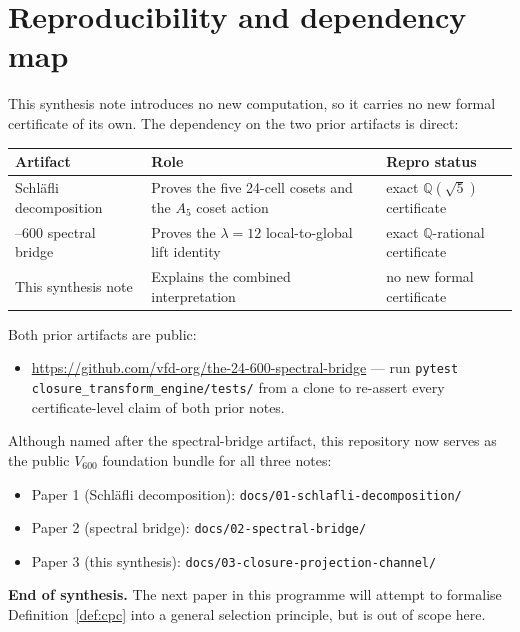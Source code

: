 \documentclass[11pt]{article}
\newcommand{\Vsix}{V_{600}}
\theoremstyle{definition}
\begin{document}
\section{Reproducibility and dependency map}\label{sec:repro}

This synthesis note introduces no new computation, so it carries no
new formal certificate of its own.  The dependency on the two prior
artifacts is direct:

\medskip
\noindent
\begin{tabular}{p{}p{}p{}}
\toprule
Artifact & Role & Repro status \\
\midrule
Schl\"afli decomposition~\cite{SmartSchlafli2026}
  & Proves the five 24-cell cosets and the $A_5$ coset action
  & exact $\mathbb{Q}(\sqrt 5)$ certificate \\
\addlinespace
24--600 spectral bridge~\cite{SmartBridge2026}
  & Proves the $\lambda=12$ local-to-global lift identity
  & exact $\mathbb{Q}$-rational certificate \\
\addlinespace
This synthesis note
  & Explains the combined interpretation
  & no new formal certificate \\
\bottomrule
\end{tabular}
\medskip

Both prior artifacts are public:
\begin{itemize}
  \item \url{https://github.com/vfd-org/the-24-600-spectral-bridge}
        --- run \texttt{pytest closure\_transform\_engine/tests/}
        from a clone to re-assert every certificate-level claim of
        both prior notes.
\end{itemize}

\smallskip
\noindent
Although named after the spectral-bridge artifact, this repository
now serves as the public $\Vsix$ foundation bundle for all three
notes:
\begin{itemize}
  \item Paper 1 (Schl\"afli decomposition): \texttt{docs/}\allowbreak\texttt{01-schlafli-decomposition/}
  \item Paper 2 (spectral bridge): \texttt{docs/}\allowbreak\texttt{02-spectral-bridge/}
  \item Paper 3 (this synthesis): \texttt{docs/}\allowbreak\texttt{03-closure-projection-channel/}
\end{itemize}

\bigskip
\noindent
\textbf{End of synthesis.}  The next paper in this programme will
attempt to formalise Definition~\ref{def:cpc} into a general
selection principle, but is out of scope here.
\end{document}
